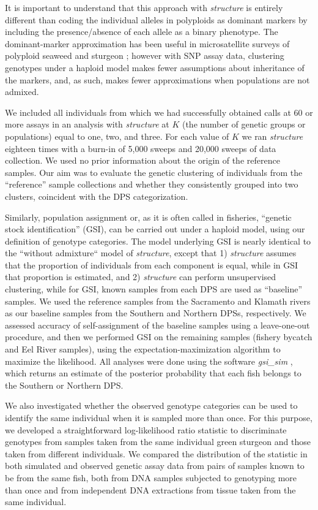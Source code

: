 It is important to understand that this approach with {\em structure}
is entirely different than coding the individual alleles in polyploids as dominant
markers by including the presence/absence of each allele as a binary
phenotype.  The dominant-marker approximation has been useful in microsatellite 
surveys of polyploid seaweed and sturgeon \citep{andreakis2009high,schreier2013patterns}; however
with SNP assay data, clustering genotypes under a haploid model makes fewer 
assumptions about inheritance of the markers, and, as such, makes fewer approximations
when populations are not admixed.


We included all individuals from which we had successfully
obtained calls at 60 or more assays in an analysis with {\em structure} at $K$ (the number
of genetic groups or populations) equal to one, two, and three. For each value of
$K$ we ran {\em structure} eighteen times with a burn-in of 5,000 sweeps and 20,000 
sweeps of data collection.  We used no prior information about the origin
of the reference samples. Our aim was to evaluate the genetic clustering of
individuals from the ``reference'' sample collections and whether they
consistently grouped into two clusters, coincident with the DPS categorization.

Similarly, population assignment or, as it is often called in
fisheries, ``genetic stock identification'' (GSI), can be carried out under a
haploid model, using our definition of genotype categories. The model underlying
GSI is nearly identical to the ``without admixture`` model of {\em structure}, except that 1)
{\em structure} assumes that the proportion of individuals from each component is
equal, while in GSI that proportion is estimated, and 2) {\em structure}
can perform unsupervised clustering, while for GSI, known samples from each
DPS are used as ``baseline'' samples. We used the reference samples from the Sacramento and
Klamath rivers as our baseline samples from the Southern and Northern DPSs,
respectively. We assessed accuracy of self-assignment of the
baseline samples using a leave-one-out procedure, and then we performed GSI on
the remaining samples (fishery bycatch and Eel River samples), using the
expectation-maximization algorithm \citep{Dempsteretal1977} to maximize the likelihood. All analyses
were done using the software {\em gsi\_sim} \citep{Andersonetal2008,Israeletal2009}, 
which returns an estimate of the posterior probability that each fish
belongs to the Southern or Northern DPS.

We also 
investigated whether the observed genotype
categories can be used to identify the same individual when it is sampled more than once.
For this purpose, we developed a straightforward log-likelihood ratio statistic
to discriminate genotypes from samples taken from the same individual
green sturgeon and those taken from different individuals. We compared the
distribution of the statistic in both simulated and observed genetic
assay data from pairs of samples known to be from the same fish, 
both from DNA samples subjected to genotyping more than once and from
independent DNA extractions from tissue taken from the same individual.

